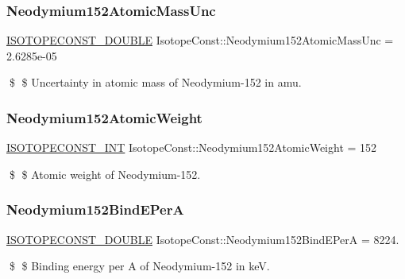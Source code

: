 \subsubsection{\texorpdfstring{Neodymium152\+Atomic\+Mass\+Unc}{Neodymium152AtomicMassUnc}}
{\footnotesize\ttfamily \mbox{\hyperlink{group___isotope_const-_macros_ga8f45a7272ce02c0b4c65c44636ed719a}{I\+S\+O\+T\+O\+P\+E\+C\+O\+N\+S\+T\+\_\+\+D\+O\+U\+B\+LE}} Isotope\+Const\+::\+Neodymium152\+Atomic\+Mass\+Unc = 2.\+6285e-\/05}

\$ \$ Uncertainty in atomic mass of Neodymium-\/152 in amu. \mbox{\label{group___isotope_const-_neodymium-_nd152_ga7ed50e1ec9d535867cab3b4f333e3b79}} 
\subsubsection{\texorpdfstring{Neodymium152\+Atomic\+Weight}{Neodymium152AtomicWeight}}
{\footnotesize\ttfamily \mbox{\hyperlink{group___isotope_const-_macros_ga5f18360b3e99483a35c32d789e62621c}{I\+S\+O\+T\+O\+P\+E\+C\+O\+N\+S\+T\+\_\+\+I\+NT}} Isotope\+Const\+::\+Neodymium152\+Atomic\+Weight = 152}

\$ \$ Atomic weight of Neodymium-\/152. \mbox{\label{group___isotope_const-_neodymium-_nd152_ga10f350b4b4593cec2d738d48bdaf3790}} 
\subsubsection{\texorpdfstring{Neodymium152\+Bind\+E\+PerA}{Neodymium152BindEPerA}}
{\footnotesize\ttfamily \mbox{\hyperlink{group___isotope_const-_macros_ga8f45a7272ce02c0b4c65c44636ed719a}{I\+S\+O\+T\+O\+P\+E\+C\+O\+N\+S\+T\+\_\+\+D\+O\+U\+B\+LE}} Isotope\+Const\+::\+Neodymium152\+Bind\+E\+PerA = 8224.}

\$ \$ Binding energy per A of Neodymium-\/152 in keV. \mbox{\label{group___isotope_const-_neodymium-_nd152_ga6aafa6a59017da2e118b499d14c72161}} 

